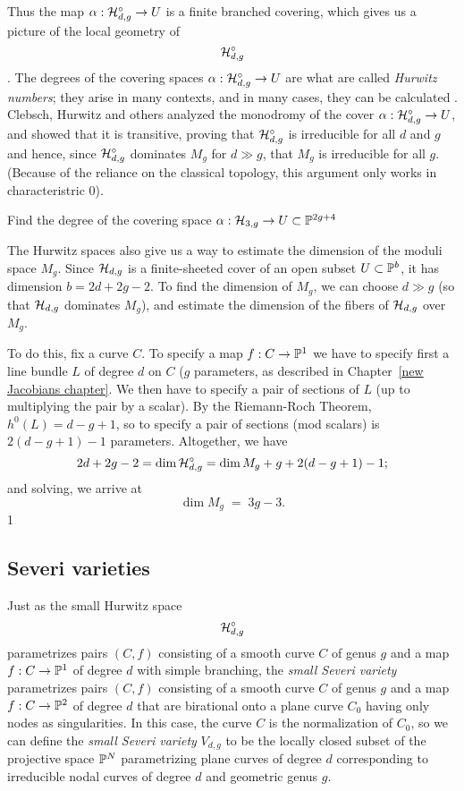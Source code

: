 Thus the map $\alpha : \cH^\circ_{d,g} \to U$ is a finite branched covering, which gives us a picture of the local geometry of $$\cH^\circ_{d,g}$$. 
The degrees of the covering spaces $\alpha : \cH^\circ_{d,g} \to U$ are what are called \emph{Hurwitz numbers}; they arise in many contexts, and in many cases, they can be calculated \cite{Graber-Vakil}. Clebsch, Hurwitz and others analyzed the monodromy of the cover $\alpha : \cH^\circ_{d,g} \to U$, and showed that it is transitive, proving that $\cH^\circ_{d,g}$ is irreducible for all $d$ and $g$ and hence, since $\cH^\circ_{d,g}$ dominates $M_g$ for $d \gg g$, that $M_g$ is irreducible for all $g$. (Because of the reliance on the classical topology, this argument only works in characteristric 0).

\begin{exercise}
Find the degree of the covering space $\alpha : \cH_{3,g} \to U \subset \PP^{2g+4}$
\end{exercise}

The Hurwitz spaces also give us a way to estimate the dimension of the moduli space $M_g$. Since $\cH_{d,g}$ is a finite-sheeted cover of an open subset $U \subset \PP^b$, it has dimension  $b = 2d+2g-2$. To find the dimension of $M_g$, we can choose $d \gg g$ (so that $\cH_{d,g}$ dominates $M_g$), and estimate the dimension of the fibers of $\cH_{d,g}$ over $M_g$.

To do this, fix a curve $C$. To specify a map $f : C \to \PP^1$ we have to specify first a line bundle $L$ of degree $d$ on $C$ ($g$ parameters, as described in Chapter~\ref{new Jacobians chapter}. We then have to specify a pair of sections of $L$ (up to multiplying the pair by a scalar). By the Riemann-Roch Theorem, $h^0(L) = d-g+1$, so to specify a pair of sections (mod scalars) is $2(d-g+1)-1$ parameters. Altogether, we have
$$
2d+2g-2 = \dim \cH^\circ_{d,g} = \dim M_g + g + 2(d-g+1)-1;
$$
and solving, we arrive at
$$
\dim M_g \; = \; 3g-3.
$$1

\subsection{Severi varieties}


Just as the small Hurwitz space $$\cH^\circ_{d,g}$$ parametrizes pairs $(C,f)$ consisting of a smooth curve $C$ of genus $g$ and a map $f : C \to \PP^1$ of degree $d$
with simple branching, the \emph{small Severi variety} parametrizes pairs $(C,f)$ consisting of a smooth curve $C$ of genus $g$ and a map $f : C \to \PP^2$ of degree $d$ that are birational onto a plane curve $C_0$ having only nodes as singularities. In this case, the curve $C$ is the normalization of $C_0$, so we can define the \emph{small Severi variety} $V_{d,g}$ to be the locally closed subset of the projective space $\PP^N$ parametrizing plane curves of degree $d$ corresponding to irreducible nodal curves of degree $d$ and geometric genus $g$.

